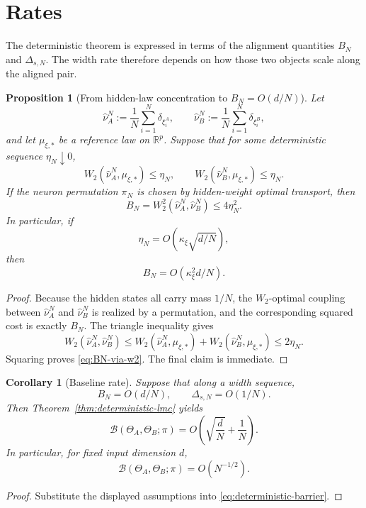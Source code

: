 \documentclass[11pt]{article}
\newtheorem{proposition}[theorem]{Proposition}
\newtheorem{corollary}[theorem]{Corollary}
\theoremstyle{definition}
\newcommand{\R}{\mathbb{R}}
\newcommand{\cB}{\mathcal{B}}
\begin{document}
\section{Rates}

The deterministic theorem is expressed in terms of the alignment quantities
$B_N$ and $\Delta_{s,N}$. The width rate therefore depends on how those two
objects scale along the aligned pair.

\begin{proposition}[From hidden-law concentration to $B_N=O(d/N)$]
\label{prop:BN-from-w2}
Let
\[
  \hat\nu_A^N:=\frac1N\sum_{i=1}^N \delta_{\xi_i^A},
  \qquad
  \hat\nu_B^N:=\frac1N\sum_{i=1}^N \delta_{\xi_i^B},
\]
and let $\mu_{\xi,\ast}$ be a reference law on $\R^p$. Suppose that for some
deterministic sequence $\eta_N\downarrow 0$,
\[
  W_2(\hat\nu_A^N,\mu_{\xi,\ast})\le \eta_N,
  \qquad
  W_2(\hat\nu_B^N,\mu_{\xi,\ast})\le \eta_N.
\]
If the neuron permutation $\pi_N$ is chosen by hidden-weight optimal transport,
then
\begin{equation}
  B_N = W_2^2(\hat\nu_A^N,\hat\nu_B^N)\le 4\eta_N^2.
  \label{eq:BN-via-w2}
\end{equation}
In particular, if
\[
  \eta_N = O(\kappa_\xi \sqrt{d/N}),
\]
then
\[
  B_N = O(\kappa_\xi^2 d/N).
\]
\end{proposition}

\begin{proof}
Because the hidden states all carry mass $1/N$, the $W_2$-optimal coupling
between $\hat\nu_A^N$ and $\hat\nu_B^N$ is realized by a permutation, and the
corresponding squared cost is exactly $B_N$. The triangle inequality gives
\[
  W_2(\hat\nu_A^N,\hat\nu_B^N)
  \le
  W_2(\hat\nu_A^N,\mu_{\xi,\ast}) + W_2(\hat\nu_B^N,\mu_{\xi,\ast})
  \le
  2\eta_N.
\]
Squaring proves \eqref{eq:BN-via-w2}. The final claim is immediate.
\end{proof}

\begin{corollary}[Baseline rate]
\label{cor:baseline-rate}
Suppose that along a width sequence,
\[
  B_N = O(d/N),
  \qquad
  \Delta_{s,N} = O(1/N).
\]
Then Theorem~\ref{thm:deterministic-lmc} yields
\[
  \cB(\Theta_A,\Theta_B;\pi)
  =
  O\!\left(\sqrt{\frac{d}{N}} + \frac1N\right).
\]
In particular, for fixed input dimension $d$,
\[
  \cB(\Theta_A,\Theta_B;\pi)=O(N^{-1/2}).
\]
\end{corollary}

\begin{proof}
Substitute the displayed assumptions into
\eqref{eq:deterministic-barrier}.
\end{proof}
\end{document}
